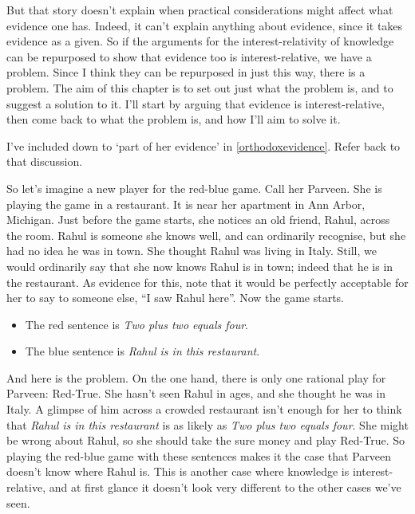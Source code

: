 \documentclass[11pt,]{book}
\providecommand{\tightlist}{%
  \setlength{\itemsep}{0pt}\setlength{\parskip}{0pt}}
\begin{document}
But that story doesn't explain when practical considerations might affect what evidence one has. Indeed, it can't explain anything about evidence, since it takes evidence as a given. So if the arguments for the interest-relativity of knowledge can be repurposed to show that evidence too is interest-relative, we have a problem. Since I think they can be repurposed in just this way, there is a problem. The aim of this chapter is to set out just what the problem is, and to suggest a solution to it. I'll start by arguing that evidence is interest-relative, then come back to what the problem is, and how I'll aim to solve it.

\begin{description}
\tightlist
\item[Note to self]
I've included down to `part of her evidence' in \ref{orthodoxevidence}. Refer back to that discussion.
\end{description}

So let's imagine a new player for the red-blue game. Call her Parveen. She is playing the game in a restaurant. It is near her apartment in Ann Arbor, Michigan. Just before the game starts, she notices an old friend, Rahul, across the room. Rahul is someone she knows well, and can ordinarily recognise, but she had no idea he was in town. She thought Rahul was living in Italy. Still, we would ordinarily say that she now knows Rahul is in town; indeed that he is in the restaurant. As evidence for this, note that it would be perfectly acceptable for her to say to someone else, ``I saw Rahul here''. Now the game starts.

\begin{itemize}
\tightlist
\item
  The red sentence is \emph{Two plus two equals four}.
\item
  The blue sentence is \emph{Rahul is in this restaurant}.
\end{itemize}

And here is the problem. On the one hand, there is only one rational play for Parveen: Red-True. She hasn't seen Rahul in ages, and she thought he was in Italy. A glimpse of him across a crowded restaurant isn't enough for her to think that \emph{Rahul is in this restaurant} is as likely as \emph{Two plus two equals four}. She might be wrong about Rahul, so she should take the sure money and play Red-True. So playing the red-blue game with these sentences makes it the case that Parveen doesn't know where Rahul is. This is another case where knowledge is interest-relative, and at first glance it doesn't look very different to the other cases we've seen.
\end{document}
